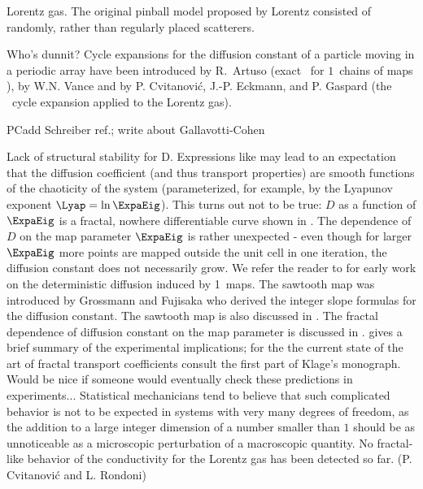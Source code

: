{Lorentz gas.}{ The original pinball model proposed by
  Lorentz consisted of randomly, rather than regularly placed
  scatterers.   } %
%


{Who's dunnit?}{ Cycle expansions for the diffusion constant of a
  particle moving in a periodic array have been introduced
  by R.~Artuso (exact \dzeta\ for $1$\dmn\ chains of maps
  ), by W.N. Vance%
  \PublicPrivate{,}{%
    (the trace formula \refeq{DL-trace} for the Lorentz gas),
  }%
  and by P. Cvitanovi\'c, J.-P. Eckmann, and
  P. Gaspard (the \dzeta\ cycle expansion 
  applied to the Lorentz gas).
} %

PC{add Schreiber ref.; write about Gallavotti-Cohen}

{Lack of structural stability for D.}{ Expressions like 
  may lead to an expectation that the diffusion coefficient (and thus
  transport properties) are smooth functions of the chaoticity of the
  system (parameterized, for example, by the Lyapunov exponent $\Lyap
  = \ln \ExpaEig$). This turns out not to be true: $D$ as a function
  of $\ExpaEig$ is a fractal, nowhere differentiable curve shown in
  . The dependence of $D$ on the map parameter
  $\ExpaEig$ is rather unexpected - even though for larger $\ExpaEig$
  more points are mapped outside the unit cell in one iteration, the
  diffusion constant does not necessarily grow. We refer the reader to
   for early work on the deterministic
  diffusion induced by 1\dmn\ maps. The sawtooth map 
  was introduced by Grossmann and Fujisaka who derived the
  integer slope formulas  for the diffusion constant. The
  sawtooth map is also discussed in . The fractal
  dependence of diffusion constant on the map parameter is discussed
  in .  gives a
  brief summary of the experimental implications; for the the current
  state of the art of fractal transport coefficients consult the first
  part of Klage's monograph. Would be nice if someone
  would eventually check these predictions in experiments...
  Statistical mechanicians tend to believe that such complicated
  behavior is not to be expected in systems with very many degrees of
  freedom, as the addition to a large integer dimension of a number
  smaller than $1$ should be as unnoticeable as a microscopic
  perturbation of a macroscopic quantity. No fractal-like behavior of
  the conductivity for the Lorentz gas has been detected so
  far.   \hfill (P. Cvitanovi\'c and
  L. Rondoni) } %

